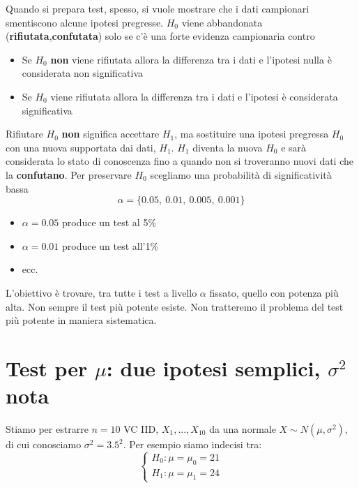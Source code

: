 \documentclass[
  11pt,
]{book}
\providecommand{\tightlist}{%
  \setlength{\itemsep}{0pt}\setlength{\parskip}{0pt}}
\theoremstyle{mytheoremstyle}
\theoremstyle{mydefstyle}
\begin{document}
Quando si prepara test, spesso, si vuole mostrare che i dati campionari smentiscono alcune ipotesi pregresse.
\(H_0\) viene abbandonata (\textbf{rifiutata},\textbf{confutata}) solo se c'è una forte evidenza campionaria contro

\begin{itemize}
\tightlist
\item
  Se \(H_0\) \textbf{non} viene rifiutata allora la differenza tra i dati e l'ipotesi nulla è considerata non significativa
\item
  Se \(H_0\) viene rifiutata allora la differenza tra i dati e l'ipotesi è considerata significativa
\end{itemize}

Rifiutare \(H_0\) \textbf{non} significa accettare \(H_1\), ma sostituire una ipotesi pregressa \(H_0\) con una nuova supportata dai dati, \(H_1\). \(H_1\) diventa la nuova \(H_0\) e sarà considerata lo stato di conoscenza fino a quando non si troveranno nuovi dati che la \textbf{confutano}.
Per preservare \(H_0\) scegliamo una probabilità di significatività bassa
\[\alpha=\{0.05,~0.01,~0.005,~0.001\}\]

\begin{itemize}
\tightlist
\item
  \(\alpha=0.05\) produce un test al 5\%
\item
  \(\alpha=0.01\) produce un test all'1\%
\item
  ecc.
\end{itemize}

L'obiettivo è trovare, tra tutte i test a livello \(\alpha\) fissato, quello con potenza più alta.
Non sempre il test più potente esiste.
Non tratteremo il problema del test più potente in maniera sistematica.

\section{\texorpdfstring{Test per \(\mu\): due ipotesi semplici, \(\sigma^2\) nota}{Test per \textbackslash mu: due ipotesi semplici, \textbackslash sigma\^{}2 nota}}\label{test-per-mu-due-ipotesi-semplici-sigma2-nota}

Stiamo per estrarre \(n=10\) VC IID, \(X_1,...,X_{10}\) da una normale \(X\sim N(\mu,\sigma^2)\), di cui conosciamo \(\sigma^2=3.5^2\).
Per esempio siamo indecisi tra:
\[\begin{cases}
H_0:\mu=\mu_0=21 \\
H_1:\mu=\mu_1=24
\end{cases}
\]
\end{document}
